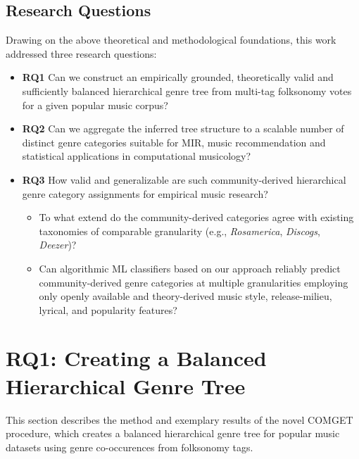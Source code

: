 \documentclass{article}
\begin{document}
\subsection{Research Questions}

Drawing on the above theoretical and methodological foundations, this work addressed three research questions: 
\begin{itemize}
  \item[] \textbf{RQ1} Can we construct an empirically grounded, theoretically valid and sufficiently balanced hierarchical genre tree from multi-tag folksonomy votes for a given popular music corpus?

  \item[] \textbf{RQ2} Can we aggregate the inferred tree structure to a scalable number of distinct genre categories suitable for MIR, music recommendation and statistical applications in computational musicology? 

  \item[] \textbf{RQ3} How valid and generalizable are such community-derived hierarchical genre category assignments for empirical music research?
   \begin{itemize}
       \item[a)] To what extend do the community-derived categories agree with existing taxonomies of comparable granularity (e.g., \textit{Rosamerica}, \textit{Discogs}, \textit{Deezer})?
       \item[b)] Can algorithmic ML classifiers based on our approach reliably predict community-derived genre categories at multiple granularities employing only openly available and theory-derived music style, release-milieu, lyrical, and popularity features?
   \end{itemize}
\end{itemize}

\section{RQ1: Creating a Balanced Hierarchical Genre Tree}

This section describes the method and exemplary results of the novel COMGET procedure, which creates a balanced hierarchical genre tree for popular music datasets using genre co-occurences from folksonomy tags.
\end{document}
